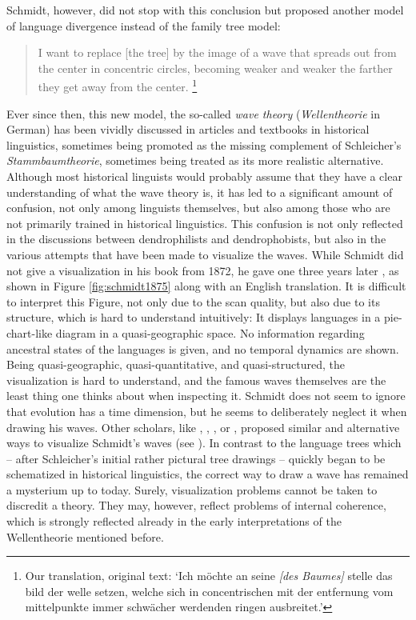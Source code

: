 \documentclass[svgnames,12pt]{scrartcl}
\begin{document}
{Schmidt, however, did not stop with this conclusion but proposed another model of language
divergence instead of the family tree model:

\begin{quote} \small I want to replace [the tree] by the image of a wave that spreads out from the
     center in concentric circles, becoming weaker and weaker the farther they get away from the
     center. \citep[27]{Schmidt1872}\footnote{Our translation, original text: `Ich möchte an seine
     \emph{[des Baumes]} stelle das bild der welle setzen, welche sich in concentrischen mit der
     entfernung vom mittelpunkte immer schwächer werdenden ringen ausbreitet.'} 
\end{quote}

Ever since then, this new model, the
so-called \emph{wave theory} (\emph{Wellentheorie} in German) has been vividly discussed in articles and textbooks in
historical linguistics, sometimes being promoted as the missing complement of Schleicher's
\emph{Stammbaumtheorie}, sometimes being treated as its more realistic alternative.
Although most historical linguists would probably assume that they have a clear understanding of
what the wave theory is, it has led to a significant amount of confusion, not only among linguists
themselves, but also among those who are not primarily trained in historical linguistics.
This confusion is not only reflected in the discussions between dendrophilists and dendrophobists,
but also in the various attempts that have been made to visualize the waves.
While Schmidt did
not give a visualization in his book from 1872, he gave one three years later \citep[199]{Schmidt1875},
as shown in Figure \ref{fig:schmidt1875} along with an English translation.
It is difficult to interpret this Figure, not only due to the scan quality, but also due to its
structure, which is hard to understand intuitively: It displays languages in a pie-chart-like
diagram in a quasi-geographic space. No information regarding ancestral states of the languages is
given, and no temporal dynamics are shown. Being quasi-geographic, quasi-quantitative, and
quasi-structured, the visualization is hard to understand, and the famous waves themselves are the
least thing one thinks about when inspecting it. Schmidt does not seem to ignore that evolution has
a time dimension, but he seems to deliberately neglect it when drawing his waves.
Other scholars, like \citet[93]{Hirt1905}, \citet[316]{Bloomfield1933}, \citet[134]{Meillet1908}, or
\citet[174]{Bonfante1931}, proposed similar and alternative ways to visualize Schmidt's waves (see
\citealt{Geisler2013}). In contrast to the language trees which – after Schleicher's initial rather
pictural tree drawings – quickly began to be schematized in historical linguistics, the correct
way to draw a wave has remained a mysterium up to today.
Surely, visualization problems cannot be taken to discredit a theory. They may, however, reflect
problems of internal coherence, which is strongly reflected already in the early interpretations of
the Wellentheorie mentioned before. 

}
\end{document}
